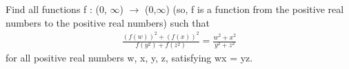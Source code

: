 \item Find all functions f : (0, $\infty$) $\rightarrow$ (0,$\infty$) (so, f is a function from the positive real numbers to the positive real numbers) such that
\begin{align*}
\frac{(f(w))^2 + (f(x))^2}{f(y^2) + f(z^2)}=\frac{w^2 + x^2}{y^2 + z^2}
\end{align*}
for all positive real numbers w, x, y, z, satisfying wx = yz.
